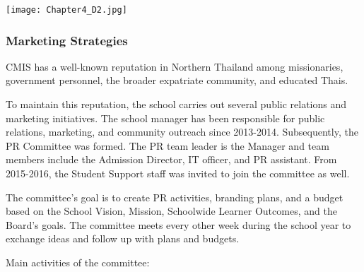 {\centering\texttt{[image: Chapter4\_D2.jpg]}}

\subsubsection{Marketing Strategies}



\begin{findings}
CMIS has a well-known reputation in Northern Thailand among missionaries, government personnel, the broader
expatriate community, and educated Thais.

To maintain this reputation, the school carries out several public relations and marketing initiatives. The school manager has been responsible for public relations, marketing, and community outreach since 2013-2014. Subsequently, the PR Committee was formed. The PR team leader is the Manager and team members include the Admission Director, IT officer, and PR assistant. From 2015-2016, the Student Support staff was invited to join the committee as well. 

The committee’s goal is to create PR activities, branding plans, and a budget based on the School Vision, Mission, Schoolwide Learner Outcomes, and the Board’s goals. The committee meets every other week during the school year to exchange ideas and follow up with plans and budgets.

Main activities of the committee:


\end{findings}
